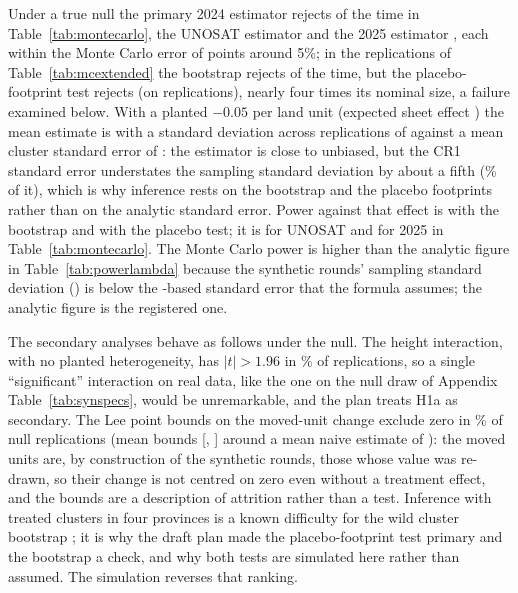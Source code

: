Under a true null the primary 2024 estimator rejects \mcRadarSize{} of the time in Table~\ref{tab:montecarlo}, the UNOSAT estimator \mcUnoSize{} and the 2025 estimator \mcEvSize, each within the Monte Carlo error of \mcSeHundred{} points around 5\%; in the \mcxReps{} replications of Table~\ref{tab:mcextended} the bootstrap rejects \mcxNullWcb{} of the time, but the placebo-footprint test rejects \mcxNullRi{} (on \mcxRiReps{} replications), nearly four times its nominal size, a failure examined below. With a planted $-0.05$ per land unit (expected sheet effect \mcExpected) the mean estimate is \mcxEffMean{} with a standard deviation across replications of \mcxEffSd{} against a mean cluster standard error of \mcxEffSe: the estimator is close to unbiased, but the CR1 standard error understates the sampling standard deviation by about a fifth (\mcxEffSeSdRatio\% of it), which is why inference rests on the bootstrap and the placebo footprints rather than on the analytic standard error. Power against that effect is \mcxEffWcb{} with the bootstrap and \mcxEffRi{} with the placebo test; it is \mcUnoPower{} for UNOSAT and \mcEvPower{} for 2025 in Table~\ref{tab:montecarlo}. The Monte Carlo power is higher than the analytic figure in Table~\ref{tab:powerlambda} because the synthetic rounds' sampling standard deviation (\mcxEffSd) is below the \regMdePooled-based standard error that the formula assumes; the analytic figure is the registered one.

The secondary analyses behave as follows under the null. The height interaction, with no planted heterogeneity, has $|t| > 1.96$ in \mcxNullInterT\% of replications, so a single ``significant'' interaction on real data, like the one on the null draw of Appendix Table~\ref{tab:synspecs}, would be unremarkable, and the plan treats H1a as secondary. The Lee point bounds on the moved-unit change exclude zero in \mcxNullLee\% of null replications (mean bounds [\mcxNullLeeLower, \mcxNullLeeUpper] around a mean naive estimate of \mcxNullLeeNaive): the moved units are, by construction of the synthetic rounds, those whose value was re-drawn, so their change is not centred on zero even without a treatment effect, and the bounds are a description of attrition rather than a test. Inference with \radarTreatedClusters{} treated clusters in four provinces is a known difficulty for the wild cluster bootstrap \citep{mackinnon2017wild,mackinnon2018few}; it is why the draft plan made the placebo-footprint test primary and the bootstrap a check, and why both tests are simulated here rather than assumed. The simulation reverses that ranking.

